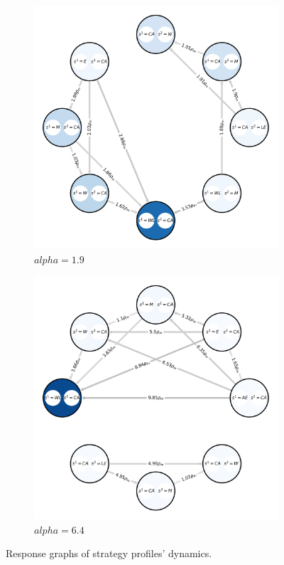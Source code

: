 \begin{figure}[H]
            \begin{subfigure}[b]{0.45\linewidth}
                \includegraphics[width=\linewidth]{images/rg_1.9.png}
                \caption{$alpha=1.9$}
                \label{fig:response_graph_1.9}
            \end{subfigure}
            \hfill
            \begin{subfigure}[b]{0.45\linewidth}
                \includegraphics[width=\linewidth]{images/rg_6.4.png}
                \caption{$alpha=6.4$}
                \label{fig:response_graph_6.4}
            \end{subfigure}

            \caption{Response graphs of strategy profiles' dynamics.}
            \label{fig:response_graphs}
        \end{figure}

